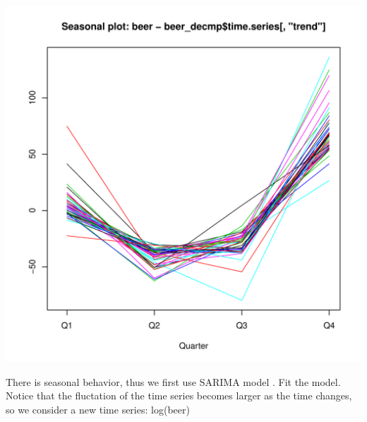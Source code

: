 \documentclass[10pt]{article}\usepackage[]{graphicx}\usepackage[]{color}
\makeatletter
\def\maxwidth{ %
  \ifdim\Gin@nat@width>\linewidth
    \linewidth
  \else
    \Gin@nat@width
  \fi
}
\newenvironment{knitrout}{}{} %
\makeatother
\begin{document}
\begin{knitrout}
\includegraphics[width=\maxwidth]{figure/unnamed-chunk-16-3} 

\end{knitrout}
There is seasonal behavior, thus we first use SARIMA model
. Fit the model.
Notice that the fluctation of the time series becomes larger as the time changes, so we consider a new time series: log(beer)
\end{document}
